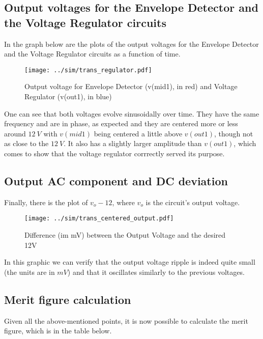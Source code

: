 \subsection{Output voltages for the Envelope Detector and the Voltage Regulator circuits}
In the graph below are the plots of the output voltages for the Envelope Detector and the Voltage Regulator circuits as a function of time.

\begin{figure}[H] \centering
\texttt{[image: ../sim/trans\_regulator.pdf]}
\caption{Output voltage for Envelope Detector (v(mid1), in red) and Voltage Regulator (v(out1), in blue)}
\label{fig:phase_sim}
\end{figure}

One can see that both voltages evolve sinusoidally over time. They have the same frequency and are in phase, as expected and they are centered more or less around $12 \ V$ with $v(mid1)$ being centered a little above $v(out1)$, though not as close to the $12 \ V$. It also has a slightly larger amplitude than $v(out1)$, which comes to show that the voltage regulator corrrectly served its purpose.




\subsection{Output AC component and DC deviation}
Finally, there is the plot of $v_o - 12$, where $v_o$ is the circuit's output voltage.

\begin{figure}[H] \centering
\texttt{[image: ../sim/trans\_centered\_output.pdf]}
\caption{Difference (im mV) between the Output Voltage and the desired 12V}
\label{fig:phase_sim}
\end{figure}

In this graphic we can verify that the output voltage ripple is indeed quite small (the units are in $mV$) and that it oscillates similarly to the previous voltages.




\subsection{Merit figure calculation}
Given all the above-mentioned points, it is now possible to calculate the merit figure, which is in the table below.


